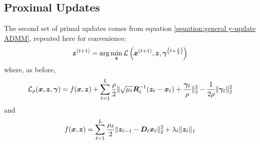 \subsection{Proximal Updates}
The second set of primal updates comes from equation \ref{equation:general y-update ADMM}, repeated here for convenience:
\begin{equation}
\bm{z}^{(t + 1)} = \arg\min_{\bm{z}} \mathcal{L}\left(\bm{x}^{(t + 1)},\bm{z},\bm{\gamma}^{\left(t + \frac{1}{2}\right)}\right)
\end{equation}
where, as before,
\begin{equation}
\mathcal{L}_{\rho}(\bm{x},\bm{z},\bm{\gamma}) = f(\bm{x},\bm{z})  +  \sum_{\ell = 1}^L \frac{\rho}{2}\|\sqrt{\mu_{\ell}}\bm{R}_{\ell}^{-1}(\bm{z}_{\ell} - \bm{x}_{\ell}) + \frac{\bm{\gamma}_{\ell}}{\rho}\|_2^2  - \frac{1}{2\rho}\|\bm{\gamma}_{\ell}\|_2^2
\end{equation}
%
and
\begin{equation}
f(\bm{x},\bm{z}) = \sum_{\ell = 1}^{L} \frac{\mu_{\ell}}{2}\|\bm{z}_{\ell - 1} -\bm{D}_{\ell}\bm{x}_{\ell}\|_2^2 + \lambda_{\ell}\|\bm{z}_{\ell}\|_1
\end{equation}

